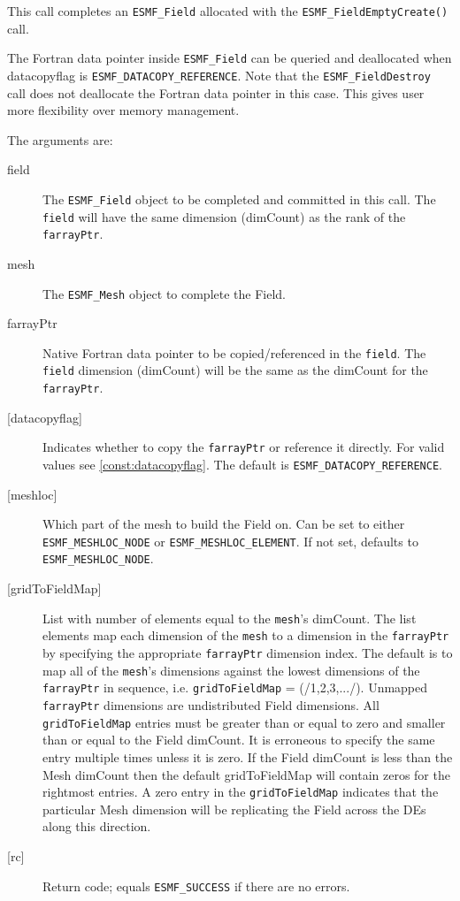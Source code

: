  
   This call completes an {\tt ESMF\_Field} allocated with the 
   {\tt ESMF\_FieldEmptyCreate()} call. 
   
   \begin{sloppypar} 
   The Fortran data pointer inside {\tt ESMF\_Field} can be queried and deallocated when 
   datacopyflag is {\tt ESMF\_DATACOPY\_REFERENCE}. Note that the {\tt ESMF\_FieldDestroy} call does not deallocate 
   the Fortran data pointer in this case. This gives user more flexibility over memory management. 
   \end{sloppypar} 
   
   The arguments are: 
   \begin{description} 
   \item [field] 
   The {\tt ESMF\_Field} object to be completed and 
   committed in this call. The {\tt field} will have the same dimension 
   (dimCount) as the rank of the {\tt farrayPtr}. 
   \item [mesh] 
   The {\tt ESMF\_Mesh} object to complete the Field. 
   \item [farrayPtr] 
   Native Fortran data pointer to be copied/referenced in the {\tt field}. 
   The {\tt field} dimension (dimCount) will be the same as the dimCount 
   for the {\tt farrayPtr}. 
   \item [{[datacopyflag]}] 
   Indicates whether to copy the {\tt farrayPtr} or reference it directly. 
   For valid values see \ref{const:datacopyflag}. The default is 
   {\tt ESMF\_DATACOPY\_REFERENCE}. 
   \item [{[meshloc]}] 
   \begin{sloppypar} 
   Which part of the mesh to build the Field on. Can be set to either 
   {\tt ESMF\_MESHLOC\_NODE} or {\tt ESMF\_MESHLOC\_ELEMENT}. If not set, 
   defaults to {\tt ESMF\_MESHLOC\_NODE}. 
   \end{sloppypar} 
   \item [{[gridToFieldMap]}] 
   List with number of elements equal to the 
   {\tt mesh}'s dimCount. The list elements map each dimension 
   of the {\tt mesh} to a dimension in the {\tt farrayPtr} by 
   specifying the appropriate {\tt farrayPtr} dimension index. The 
   default is to map all of the {\tt mesh}'s dimensions against the 
   lowest dimensions of the {\tt farrayPtr} in sequence, i.e. 
   {\tt gridToFieldMap} = (/1,2,3,.../). 
   Unmapped {\tt farrayPtr} dimensions are undistributed Field 
   dimensions. 
   All {\tt gridToFieldMap} entries must be greater than or equal 
   to zero and smaller than or equal to the Field dimCount. It is erroneous 
   to specify the same entry multiple times unless it is zero. 
   If the Field dimCount is less than the Mesh dimCount then the default 
   gridToFieldMap will contain zeros for the rightmost entries. A zero 
   entry in the {\tt gridToFieldMap} indicates that the particular 
   Mesh dimension will be replicating the Field across the DEs along 
   this direction. 
   \item [{[rc]}] 
   Return code; equals {\tt ESMF\_SUCCESS} if there are no errors. 
   \end{description} 
    

